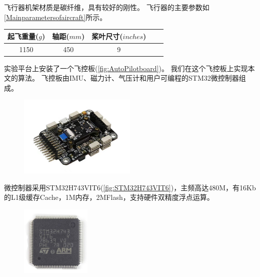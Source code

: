 \documentclass[
  type=master
]{gdutthesis}
\begin{document}
飞行器机架材质是碳纤维，具有较好的刚性。
飞行器的主要参数如\autoref{Mainparametersofaircraft}所示。
\begin{table}[h]
	\label{Mainparametersofaircraft}
	\begin{tabular}{ccccc}
		\toprule
		起飞重量($g$) & 轴距($mm$) & 桨叶尺寸($inches$)\\
		\midrule
		1150 & 450 & 9 \\ 
		\bottomrule 
	\end{tabular}
\end{table}

实验平台上安装了一个飞控板(\autoref{fig:AutoPilotboard})。
我们在这个飞控板上实现本文的算法。
飞控板由IMU、磁力计、气压计和用户可编程的STM32微控制器组成。
\begin{figure}[H]
	\centering
	\includegraphics[width=0.5\textwidth]{acfly.jpg}
	\label{fig:AutoPilotboard}
\end{figure}

微控制器采用STM32H743VIT6(\autoref{fig:STM32H743VIT6})，主频高达480M，有16Kb的L1级缓存Cache，1M内存，2MFlash，支持硬件双精度浮点运算。
\begin{figure}[H]
	\centering
	\includegraphics[width=0.3\textwidth]{St-Semiconductor-Chips-Electronic-Component-Lqfp-100-Stm32h743vit6.jpg}
	\label{fig:STM32H743VIT6}
\end{figure}
\end{document}
